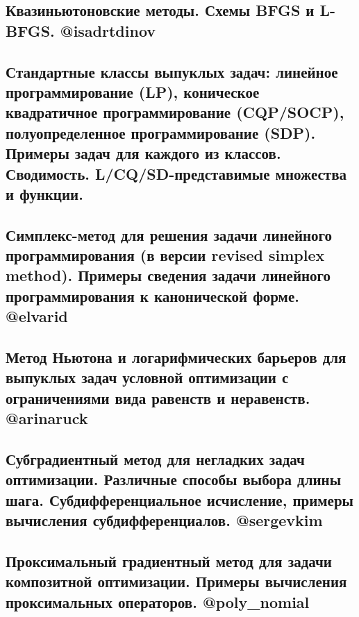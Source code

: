 \documentclass[a4paper, 16pt]{article}
\begin{document}
    

    \subsection{Квазиньютоновские методы. Схемы BFGS и L-BFGS. @isadrtdinov}

    

    \subsection{Стандартные классы выпуклых задач: линейное программирование (LP), коническое квадратичное программирование (CQP/SOCP), полуопределенное программирование (SDP). Примеры задач для каждого из классов. Сводимость. L/CQ/SD-представимые множества и функции.}

    

    \subsection{Симплекс-метод для решения задачи линейного программирования (в версии revised simplex method). Примеры сведения задачи линейного программирования к канонической форме. @elvarid}

    

    \subsection{Метод Ньютона и логарифмических барьеров для выпуклых задач условной оптимизации с ограничениями вида равенств и неравенств. @arinaruck}

    

    \subsection{Субградиентный метод для негладких задач оптимизации. Различные способы выбора длины шага. Субдифференциальное исчисление, примеры вычисления субдифференциалов. @sergevkim}

    

    \subsection{Проксимальный градиентный метод для задачи композитной оптимизации. Примеры вычисления проксимальных операторов. @poly\_nomial}
\end{document}
